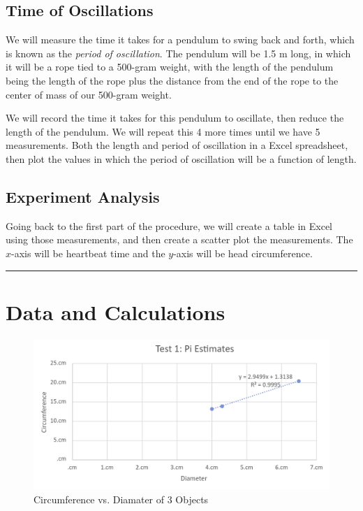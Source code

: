 \documentclass{article}
\begin{document}
\subsection{Time of Oscillations}
We will measure the time it takes for a pendulum to swing back and forth, which is known 
as the \emph{period of oscillation}. The pendulum will be 1.5 m long, in which it will be a rope tied 
to a 500-gram weight, with the length of the pendulum being the length of the rope plus the 
distance from the end of the rope to the center of mass of our 500-gram weight.

We will record the time it takes for this pendulum to oscillate, then reduce the length of 
the pendulum. We will repeat this 4 more times until we have 5 measurements. Both the length 
and period of oscillation in a Excel spreadsheet, then plot the values in which the period of 
oscillation will be a function of length.  

\subsection{Experiment Analysis}
Going back to the first part of the procedure, we will create a table in Excel using 
those measurements, and then create a scatter plot the measurements. The $x$-axis will 
be heartbeat time and the $y$-axis will be head circumference. 

\vspace{1em}
\hrule
\section{Data and Calculations}
\begin{figure}[H]
    \includegraphics[width=16cm]{lab1_plot1.png}
    \caption{Circumference vs. Diamater of 3 Objects}
    \label{plot:1}
\end{figure}
\end{document}
